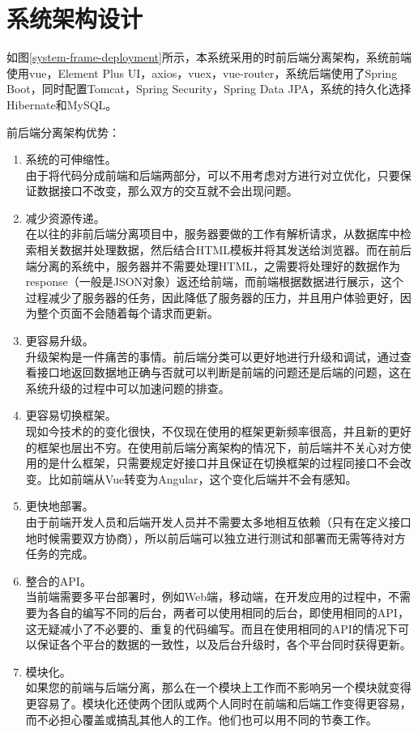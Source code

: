 \section{系统架构设计}

如图\ref{system-frame-deployment}所示，本系统采用的时前后端分离架构，系统前端使用vue，Element Plus UI，axios，vuex，vue-router，系统后端使用了Spring Boot，同时配置Tomcat，Spring Security，Spring Data JPA，系统的持久化选择Hibernate和MySQL。

前后端分离架构优势：
\begin{enumerate}
    \item 系统的可伸缩性。\\由于将代码分成前端和后端两部分，可以不用考虑对方进行对立优化，只要保证数据接口不改变，那么双方的交互就不会出现问题。
    \item 减少资源传递。\\在以往的非前后端分离项目中，服务器要做的工作有解析请求，从数据库中检索相关数据并处理数据，然后结合HTML模板并将其发送给浏览器。而在前后端分离的系统中，服务器并不需要处理HTML，之需要将处理好的数据作为response（一般是JSON对象）返还给前端，而前端根据数据进行展示，这个过程减少了服务器的任务，因此降低了服务器的压力，并且用户体验更好，因为整个页面不会随着每个请求而更新。
    \item 更容易升级。\\升级架构是一件痛苦的事情。前后端分类可以更好地进行升级和调试，通过查看接口地返回数据地正确与否就可以判断是前端的问题还是后端的问题，这在系统升级的过程中可以加速问题的排查。
    \item 更容易切换框架。\\现如今技术的的变化很快，不仅现在使用的框架更新频率很高，并且新的更好的框架也层出不穷。在使用前后端分离架构的情况下，前后端并不关心对方使用的是什么框架，只需要规定好接口并且保证在切换框架的过程同接口不会改变。比如前端从Vue转变为Angular，这个变化后端并不会有感知。
    \item 更快地部署。\\由于前端开发人员和后端开发人员并不需要太多地相互依赖（只有在定义接口地时候需要双方协商），所以前后端可以独立进行测试和部署而无需等待对方任务的完成。
    \item 整合的API。\\当前端需要多平台部署时，例如Web端，移动端，在开发应用的过程中，不需要为各自的编写不同的后台，两者可以使用相同的后台，即使用相同的API，这无疑减小了不必要的、重复的代码编写。而且在使用相同的API的情况下可以保证各个平台的数据的一致性，以及后台升级时，各个平台同时获得更新。
    \item 模块化。\\如果您的前端与后端分离，那么在一个模块上工作而不影响另一个模块就变得更容易了。模块化还使两个团队或两个人同时在前端和后端工作变得更容易，而不必担心覆盖或搞乱其他人的工作。他们也可以用不同的节奏工作。
\end{enumerate}

